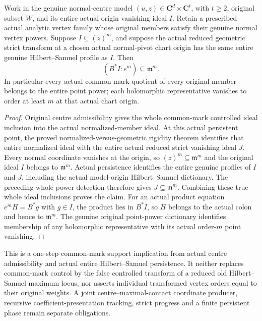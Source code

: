 \begin{theorem}
\label{hir:actual-persistent-common-mark-cosupport}
\leanok
Work in the genuine normal-centre model $(u,z)\in\mathbf C^d\times\mathbf C^t$, with $t\ge2$, original subset $W$, and its entire actual origin vanishing ideal $I$. Retain a prescribed actual analytic vertex family whose original members satisfy their genuine normal vertex powers. Suppose $I\subseteq(z)^m$, and suppose the actual reduced geometric strict transform at a chosen actual normal-pivot chart origin has the same entire genuine Hilbert--Samuel profile as $I$. Then
\[
 (B^*I:e^m)\subseteq\mathfrak m^m.
\]
In particular every actual common-mark quotient of every original member belongs to the entire point power; each holomorphic representative vanishes to order at least $m$ at that actual chart origin.
\end{theorem}
\begin{proof}
Original centre admissibility gives the whole common-mark controlled ideal inclusion into the actual normalized-member ideal. At this actual persistent point, the proved normalized-versus-geometric rigidity theorem identifies that entire normalized ideal with the entire actual reduced strict vanishing ideal $J$. Every normal coordinate vanishes at the origin, so $(z)^m\subseteq\mathfrak m^m$ and the original ideal $I$ belongs to $\mathfrak m^m$. Actual persistence identifies the entire genuine profiles of $I$ and $J$, including the actual model-origin Hilbert--Samuel dictionary. The preceding whole-power detection therefore gives $J\subseteq\mathfrak m^m$. Combining these true whole ideal inclusions proves the claim. For an actual product equation $e^mH=B^*g$ with $g\in I$, the product lies in $B^*I$, so $H$ belongs to the actual colon and hence to $\mathfrak m^m$. The genuine original point-power dictionary identifies membership of any holomorphic representative with its actual order-$m$ point vanishing.
\end{proof}

\begin{remark}
This is a one-step common-mark support implication from actual centre admissibility and actual entire Hilbert--Samuel persistence. It neither replaces common-mark control by the false controlled transform of a reduced old Hilbert--Samuel maximum locus, nor asserts individual transformed vertex orders equal to their original weights. A joint centre--maximal-contact coordinate producer, recursive coefficient-presentation tracking, strict progress and a finite persistent phase remain separate obligations.
\end{remark}
